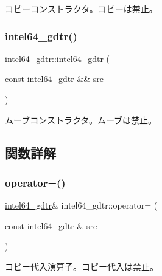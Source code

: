 コピーコンストラクタ。コピーは禁止。 \hypertarget{classintel64__gdtr_a48ba8bca138e66c87612a8fc463049c8}{}\label{classintel64__gdtr_a48ba8bca138e66c87612a8fc463049c8} 
\subsubsection{\texorpdfstring{intel64\+\_\+gdtr()}{intel64\_gdtr()}\hspace{0.1cm}{\footnotesize\ttfamily [3/3]}}
{\footnotesize\ttfamily intel64\+\_\+gdtr\+::intel64\+\_\+gdtr (\begin{DoxyParamCaption}\item[{const \hyperlink{classintel64__gdtr}{intel64\+\_\+gdtr} \&\&}]{src }\end{DoxyParamCaption})\hspace{0.3cm}{\ttfamily [delete]}}

ムーブコンストラクタ。ムーブは禁止。 

\subsection{関数詳解}
\hypertarget{classintel64__gdtr_ab705898205d714e2106fb3d9644a4c93}{}\label{classintel64__gdtr_ab705898205d714e2106fb3d9644a4c93} 
\subsubsection{\texorpdfstring{operator=()}{operator=()}\hspace{0.1cm}{\footnotesize\ttfamily [1/2]}}
{\footnotesize\ttfamily \hyperlink{classintel64__gdtr}{intel64\+\_\+gdtr}\& intel64\+\_\+gdtr\+::operator= (\begin{DoxyParamCaption}\item[{const \hyperlink{classintel64__gdtr}{intel64\+\_\+gdtr} \&}]{src }\end{DoxyParamCaption})\hspace{0.3cm}{\ttfamily [delete]}}

コピー代入演算子。コピー代入は禁止。 \hypertarget{classintel64__gdtr_a0d73a6320ba02bae68e79c4a2157366e}{}\label{classintel64__gdtr_a0d73a6320ba02bae68e79c4a2157366e} 
